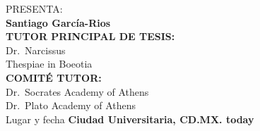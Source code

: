 \documentclass[
  10pt]{article}
\renewcommand*\contentsname{Tabla de contenidos}
\newcommand\contentsname{Tabla de contenidos}
\begin{document}
\begin{titlepage}
\begin{center}
        {\large PRESENTA:}\\[0.1cm]
        {\LARGE \textbf{Santiago García-Rios}}\\[0.4cm]
        
        {\small \textbf{TUTOR PRINCIPAL DE TESIS:}}\\
        {\small  Dr.~Narcissus }\\
        {\small  Thespiae in Boeotia }\\[0.5cm]
        
        {\small \textbf{COMITÉ TUTOR:}}\\
        {\small  Dr.~Socrates } {\small  Academy of Athens }\\
        {\small  Dr.~Plato } {\small  Academy of Athens }\\
        
        Lugar y fecha
        \vfill
                {\small \textbf{{Ciudad Universitaria,
CD.MX.} \hfill {today}}}\\
                
    \end{center}
\end{titlepage}



\newpage
\begin{center}
\end{center}

\newpage
\begin{center}
\end{center}

\newpage


\newpage


\newpage


\newpage
\begin{center}
\end{center}


\renewcommand*\contentsname{Tabla de contenidos}
\newpage
\tableofcontents
\end{document}
